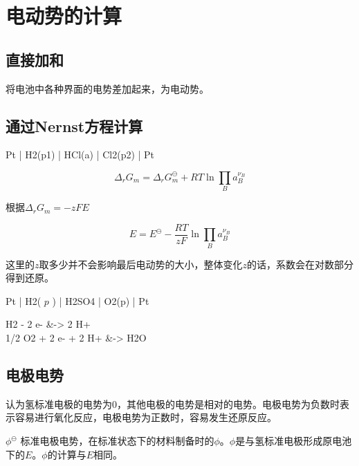 
    \section{电动势的计算}

    \subsection{直接加和}

    将电池中各种界面的电势差加起来，为电动势。

    \subsection{通过Nernst方程计算}

    \begin{reaction*}
        Pt | H2(p1) | HCl(a) | Cl2(p2) | Pt
    \end{reaction*}

    \begin{equation*}
        \Delta_r G_m = \Delta_r G_m ^\ominus + RT\ln \prod _{B} a_B^{\nu_B}
    \end{equation*}

    根据$\Delta_r G_m = -zFE$

    \begin{equation*}
        E = E^\ominus - \frac{RT}{zF} \ln \prod _{B} a_B^{\nu_B}
    \end{equation*}

    这里的$z$取多少并不会影响最后电动势的大小，整体变化$z$的话，系数会在对数部分得到还原。

    \begin{reaction*}
        Pt | H2( $p$ ) | H2SO4 | O2(p) | Pt
    \end{reaction*}


    \begin{reactions*}
        H2 - 2 e- &-> 2 H+ \\
        1/2 O2 + 2 e- + 2 H+ &-> H2O
    \end{reactions*}

    \subsection{电极电势}

    认为氢标准电极的电势为0，其他电极的电势是相对的电势。电极电势为负数时表示容易进行氧化反应，电极电势为正数时，容易发生还原反应。

    $\phi^{\ominus}$ 标准电极电势，在标准状态下的材料制备时的$\phi$。$\phi$是与氢标准电极形成原电池下的$E$。$\phi$的计算与$E$相同。

